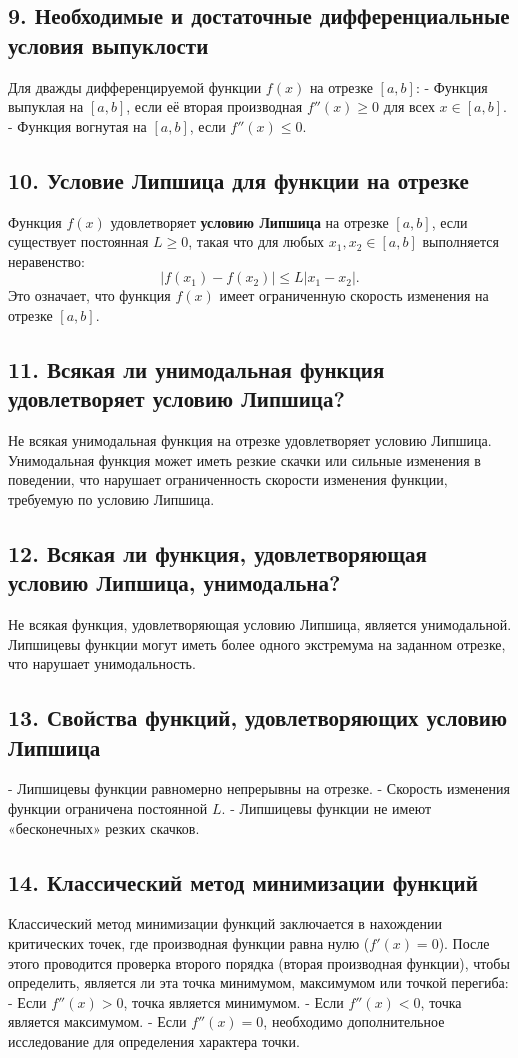 \documentclass[a4paper,12pt]{article}
\begin{document}
\subsection*{9. Необходимые и достаточные дифференциальные условия выпуклости}
Для дважды дифференцируемой функции \( f(x) \) на отрезке \( [a, b] \):
- Функция выпуклая на \( [a, b] \), если её вторая производная \( f''(x) \geq 0 \) для всех \( x \in [a, b] \).
- Функция вогнутая на \( [a, b] \), если \( f''(x) \leq 0 \).

\subsection*{10. Условие Липшица для функции на отрезке}
Функция \( f(x) \) удовлетворяет \textbf{условию Липшица} на отрезке \( [a, b] \), если существует постоянная \( L \geq 0 \), такая что для любых \( x_1, x_2 \in [a, b] \) выполняется неравенство:
\[
|f(x_1) - f(x_2)| \leq L |x_1 - x_2|.
\]
Это означает, что функция \( f(x) \) имеет ограниченную скорость изменения на отрезке \( [a, b] \).

\subsection*{11. Всякая ли унимодальная функция удовлетворяет условию Липшица?}
Не всякая унимодальная функция на отрезке удовлетворяет условию Липшица. Унимодальная функция может иметь резкие скачки или сильные изменения в поведении, что нарушает ограниченность скорости изменения функции, требуемую по условию Липшица.

\subsection*{12. Всякая ли функция, удовлетворяющая условию Липшица, унимодальна?}
Не всякая функция, удовлетворяющая условию Липшица, является унимодальной. Липшицевы функции могут иметь более одного экстремума на заданном отрезке, что нарушает унимодальность.

\subsection*{13. Свойства функций, удовлетворяющих условию Липшица}
- Липшицевы функции равномерно непрерывны на отрезке.
- Скорость изменения функции ограничена постоянной \( L \).
- Липшицевы функции не имеют «бесконечных» резких скачков.

\subsection*{14. Классический метод минимизации функций}
Классический метод минимизации функций заключается в нахождении критических точек, где производная функции равна нулю (\( f'(x) = 0 \)). После этого проводится проверка второго порядка (вторая производная функции), чтобы определить, является ли эта точка минимумом, максимумом или точкой перегиба:
- Если \( f''(x) > 0 \), точка является минимумом.
- Если \( f''(x) < 0 \), точка является максимумом.
- Если \( f''(x) = 0 \), необходимо дополнительное исследование для определения характера точки.
\end{document}
